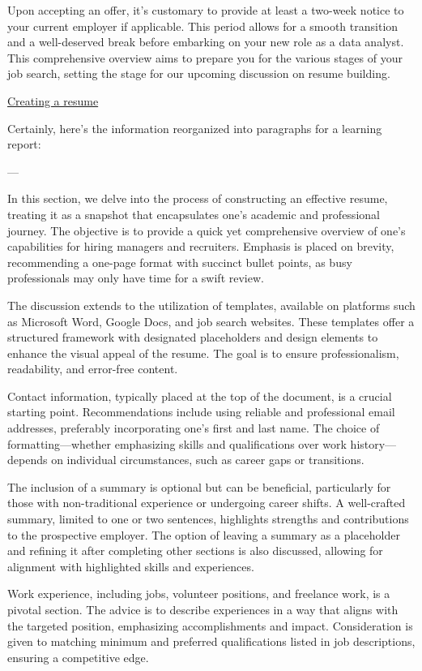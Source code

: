\documentclass[]{article}
\begin{document}
Upon accepting an offer, it's customary to provide at least a two-week notice to your current employer if applicable. This period allows for a smooth transition and a well-deserved break before embarking on your new role as a data analyst. This comprehensive overview aims to prepare you for the various stages of your job search, setting the stage for our upcoming discussion on resume building.

\uline{Creating a resume}

Certainly, here's the information reorganized into paragraphs for a learning report:

---

In this section, we delve into the process of constructing an effective resume, treating it as a snapshot that encapsulates one's academic and professional journey. The objective is to provide a quick yet comprehensive overview of one's capabilities for hiring managers and recruiters. Emphasis is placed on brevity, recommending a one-page format with succinct bullet points, as busy professionals may only have time for a swift review.

The discussion extends to the utilization of templates, available on platforms such as Microsoft Word, Google Docs, and job search websites. These templates offer a structured framework with designated placeholders and design elements to enhance the visual appeal of the resume. The goal is to ensure professionalism, readability, and error-free content.

Contact information, typically placed at the top of the document, is a crucial starting point. Recommendations include using reliable and professional email addresses, preferably incorporating one's first and last name. The choice of formatting—whether emphasizing skills and qualifications over work history—depends on individual circumstances, such as career gaps or transitions.

The inclusion of a summary is optional but can be beneficial, particularly for those with non-traditional experience or undergoing career shifts. A well-crafted summary, limited to one or two sentences, highlights strengths and contributions to the prospective employer. The option of leaving a summary as a placeholder and refining it after completing other sections is also discussed, allowing for alignment with highlighted skills and experiences.

Work experience, including jobs, volunteer positions, and freelance work, is a pivotal section. The advice is to describe experiences in a way that aligns with the targeted position, emphasizing accomplishments and impact. Consideration is given to matching minimum and preferred qualifications listed in job descriptions, ensuring a competitive edge.
\end{document}
